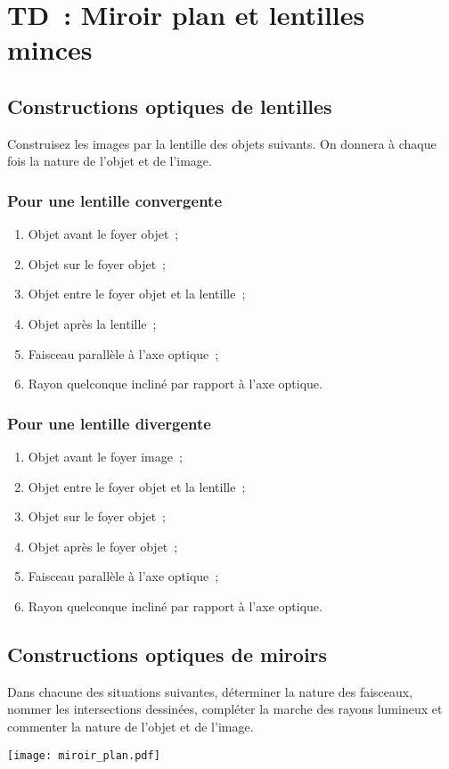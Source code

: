 \documentclass[a4paper, 12pt, final, garamond]{book}
\begin{document}
\setcounter{chapter}{2}

\chapter{TD~: Miroir plan et lentilles minces}

\section{Constructions optiques de lentilles}

Construisez les images par la lentille des objets suivants. On donnera à chaque
fois la nature de l'objet et de l'image.

\subsection{Pour une lentille convergente}
\begin{enumerate}
    \item Objet avant le foyer objet~;
    \item Objet sur le foyer objet~;
    \item Objet entre le foyer objet et la lentille~;
    \item Objet après la lentille~;
    \item Faisceau parallèle à l'axe optique~;
    \item Rayon quelconque incliné par rapport à l'axe optique.
\end{enumerate}

\subsection{Pour une lentille divergente}
\begin{enumerate}
    \item Objet avant le foyer image~;
    \item Objet entre le foyer objet et la lentille~;
    \item Objet sur le foyer objet~;
    \item Objet après le foyer objet~;
    \item Faisceau parallèle à l'axe optique~;
    \item Rayon quelconque incliné par rapport à l'axe optique.
\end{enumerate}

\section{Constructions optiques de miroirs}
Dans chacune des situations suivantes, déterminer la nature des faisceaux,
nommer les intersections dessinées, compléter la marche des rayons lumineux et
commenter la nature de l'objet et de l'image.
\begin{center}
    \texttt{[image: miroir\_plan.pdf]}
\end{center}
\end{document}
